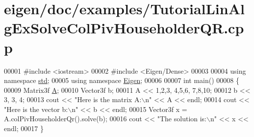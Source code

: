 \hypertarget{eigen_2doc_2examples_2_tutorial_lin_alg_ex_solve_col_piv_householder_q_r_8cpp_source}{}\section{eigen/doc/examples/\+Tutorial\+Lin\+Alg\+Ex\+Solve\+Col\+Piv\+Householder\+QR.cpp}
\label{eigen_2doc_2examples_2_tutorial_lin_alg_ex_solve_col_piv_householder_q_r_8cpp_source}

\begin{DoxyCode}
00001 \textcolor{preprocessor}{#include <iostream>}
00002 \textcolor{preprocessor}{#include <Eigen/Dense>}
00003 
00004 \textcolor{keyword}{using namespace }\hyperlink{namespacestd}{std};
00005 \textcolor{keyword}{using namespace }\hyperlink{namespace_eigen}{Eigen};
00006 
00007 \textcolor{keywordtype}{int} main()
00008 \{
00009    Matrix3f \hyperlink{group___core___module_class_eigen_1_1_matrix}{A};
00010    Vector3f b;
00011    A << 1,2,3,  4,5,6,  7,8,10;
00012    b << 3, 3, 4;
00013    cout << \textcolor{stringliteral}{"Here is the matrix A:\(\backslash\)n"} << A << endl;
00014    cout << \textcolor{stringliteral}{"Here is the vector b:\(\backslash\)n"} << b << endl;
00015    Vector3f x = A.colPivHouseholderQr().solve(b);
00016    cout << \textcolor{stringliteral}{"The solution is:\(\backslash\)n"} << x << endl;
00017 \}
\end{DoxyCode}
